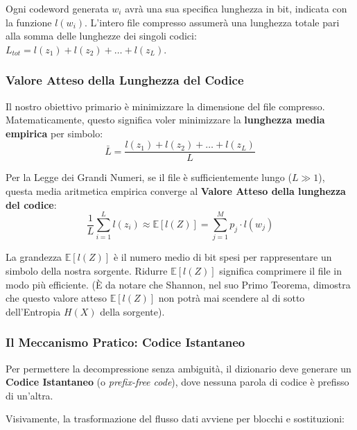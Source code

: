 Ogni codeword generata $w_i$ avrà una sua specifica lunghezza in bit, indicata con la funzione $l(w_i)$. L'intero file compresso assumerà una lunghezza totale pari alla somma delle lunghezze dei singoli codici: $L_{tot} = l(z_1) + l(z_2) + \dots + l(z_L)$.

\subsubsection{Valore Atteso della Lunghezza del Codice}

Il nostro obiettivo primario è minimizzare la dimensione del file compresso. Matematicamente, questo significa voler minimizzare la \textbf{lunghezza media empirica} per simbolo:
\begin{equation}
\bar{L} = \frac{l(z_1) + l(z_2) + \dots + l(z_L)}{L}
\end{equation}

Per la Legge dei Grandi Numeri, se il file è sufficientemente lungo ($L \gg 1$), questa media aritmetica empirica converge al \textbf{Valore Atteso della lunghezza del codice}:
\begin{equation}
\frac{1}{L} \sum_{i=1}^{L} l(z_i) \approx \mathbb{E}[l(Z)] = \sum_{j=1}^{M} p_j \cdot l(w_j)
\end{equation}

La grandezza $\mathbb{E}[l(Z)]$ è il numero medio di bit spesi per rappresentare un simbolo della nostra sorgente. Ridurre $\mathbb{E}[l(Z)]$ significa comprimere il file in modo più efficiente. (È da notare che Shannon, nel suo Primo Teorema, dimostra che questo valore atteso $\mathbb{E}[l(Z)]$ non potrà mai scendere al di sotto dell'Entropia $H(X)$ della sorgente).

\subsubsection{Il Meccanismo Pratico: Codice Istantaneo}

Per permettere la decompressione senza ambiguità, il dizionario deve generare un \textbf{Codice Istantaneo} (o \textit{prefix-free code}), dove nessuna parola di codice è prefisso di un'altra. 

Visivamente, la trasformazione del flusso dati avviene per blocchi e sostituzioni:

